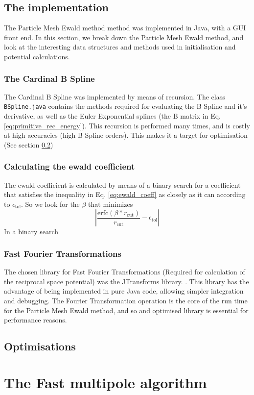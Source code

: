 \documentclass[pdftex,twoside,a4paper]{report}
\newcommand{\pmem}{Particle Mesh Ewald method}
\begin{document}
\subsection{The implementation}
The \pmem{} method was implemented in Java, with a GUI front end. In this section, we break down the \pmem{}, and look at the interesting data structures and methods used in initialisation and potential calculations.

\subsubsection{The Cardinal B Spline}
The Cardinal B Spline was implemented by means of recursion. The class \texttt{BSpline.java} contains the methods required for evaluating the B Spline and it's derivative, as well as the Euler Exponential splines (the B matrix in Eq. \ref{eq:primitive_rec_energy}). This recursion is performed many times, and is costly at high accuracies (high B Spline orders). This makes it a target for optimisation (See section \ref{sec:optimisations})
\subsubsection{Calculating the ewald coefficient}
The ewald coefficient is calculated by means of a binary search for a coefficient that satisfies the inequality in Eq. \ref{eq:ewald_coeff} as closely as it can according to $\epsilon_{\text{tol}}$. So we look for the $\beta$ that minimizes
\[
\left| \frac{\text{erfc}(\beta * r_{\text{cut}})}{r_\text{cut}} - \epsilon_\text{tol} \right| 
\]
In a binary search
\subsubsection{Fast Fourier Transformations}
\cite{JTransform}
The chosen library for Fast Fourier Transformations (Required for calculation of the reciprocal space potential) was the JTransforms library. \cite{JTransform}. This library has the advantage of being implemented in pure Java code, allowing simpler integration and debugging. The Fourier Transformation operation is the core of the run time for the \pmem{}, and so and optimised library is essential for performance reasons.
\subsection{Optimisations}
\label{sec:optimisations}
\section{The Fast multipole algorithm}
\end{document}

